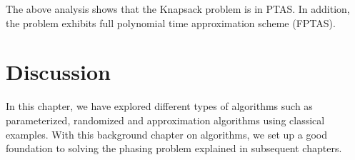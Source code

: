 % 
% 
% 

The above analysis shows that the Knapsack problem is in PTAS. In addition, the problem exhibits full polynomial time approximation scheme (FPTAS).

\section{Discussion}
In this chapter, we have explored different types of algorithms such as parameterized, randomized and approximation algorithms using classical examples.
With this background chapter on algorithms, we set up a good foundation to solving the phasing problem explained in subsequent chapters.

% 
% 

